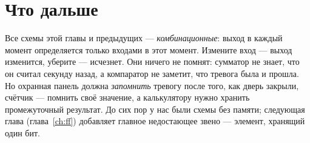 \section{Что дальше}

Все схемы этой главы и предыдущих --- \emph{комбинационные}: выход в каждый
момент определяется только входами в этот момент. Измените вход --- выход
изменится, уберите --- исчезнет. Они ничего не помнят: сумматор не знает, что
он считал секунду назад, а компаратор не заметит, что тревога была и
прошла. Но охранная панель должна \emph{запомнить} тревогу после того, как
дверь закрыли, счётчик --- помнить своё значение, а калькулятору нужно
хранить промежуточный результат. До сих пор у нас были схемы без памяти;
следующая глава (глава~\ref{ch:ff}) добавляет главное недостающее звено ---
элемент, хранящий один бит.
